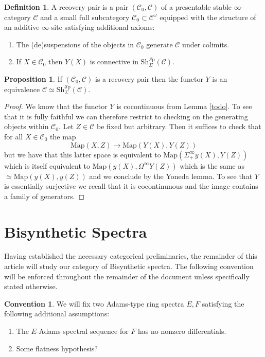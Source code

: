 \documentclass[10pt]{amsart}
\theoremstyle{definition}
\numberwithin{figure}{section}
\numberwithin{equation}{section}
\newtheorem{proposition}[figure]{Proposition}
\newtheorem{definition}[figure]{Definition}
\newtheorem{convention}[figure]{Convention}
\newcommand{\cC}{\mathcal{C}}
\theoremstyle{cited}
\newcommand{\Sp}{{\mathcal{S}\mathrm{p}}}
\newcommand{\Map}{\mathrm{Map}}
\newcommand{\Sh}{\mathrm{Sh}}
\begin{document}
\begin{definition}
  A recovery pair is a pair $(\cC_0,\cC)$ of a presentable stable $\infty$-category $\cC$ and a small full subcategory $\cC_0\subset \cC^\omega$ equipped with the structure of an additive $\infty$-site satisfying additional axioms:
  \begin{enumerate}
    \item The (de)suspensions of the objects in $\cC_0$ generate $\cC$ under colimits.
    \item If $X\in \cC_0$ then $Y(X)$ is connective in $\Sh_\Sigma^\Sp(\cC)$.
  \end{enumerate}
\end{definition}

\begin{proposition}\label{prop:recpairrecovers}
  If $(\cC_0,\cC)$ is a recovery pair then the functor $Y$ is an equivalence $\cC\simeq \Sh_\Sigma^\Sp(\cC)$.
\end{proposition}

\begin{proof}
  We know that the functor $Y$ is cocontinuous from Lemma \ref{todo}. To see that it is fully faithful we can therefore restrict to checking on the generating objects within $\cC_0$. Let $Z\in \cC$ be fixed but arbitrary. Then it suffices to check that for all $X\in \cC_0$ the map
  \[
    \Map(X,Z)\to \Map(Y(X),Y(Z))
  \]
  but we have that this latter space is equivalent to $\Map(\Sigma_+^\infty y(X), Y(Z))$ which is itself equivalent to $\Map(y(X), \Omega^\infty Y(Z))$ which is the same as $\simeq\Map(y(X),y(Z))$ and we conclude by the Yoneda lemma. To see that $Y$ is essentially surjective we recall that it is cocontinunous and the image contains a family of generators.
\end{proof} 


\section{Bisynthetic Spectra}

Having established the necessary categorical preliminaries, the remainder of this article will study our category of Bisynthetic spectra. The following convention will be enforced throughout the remainder of the document unless specifically stated otherwise. 

\begin{convention}
  We will fix two Adams-type ring spectra $E,F$ satisfying the following additional assumptions:
  \begin{enumerate}
      \item The $E$-Adams spectral sequence for $F$ has no nonzero differentials.
      \item Some flatness hypothesis?
  \end{enumerate}
\end{convention}
\end{document}
